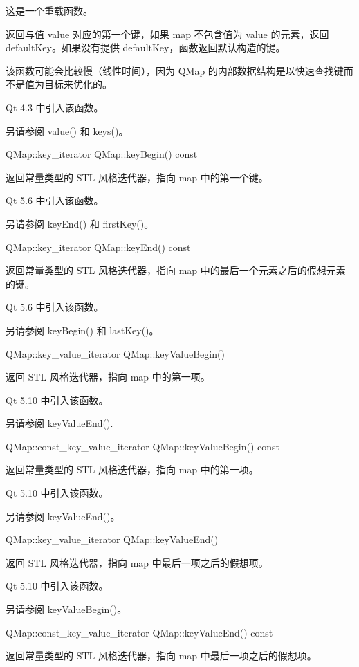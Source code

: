 这是一个重载函数。

返回与值 value 对应的第一个键，如果 map 不包含值为 value 的元素，返回 defaultKey。如果没有提供 defaultKey，函数返回默认构造的键。

该函数可能会比较慢（线性时间），因为 QMap 的内部数据结构是以快速查找键而不是值为目标来优化的。

Qt 4.3 中引入该函数。

另请参阅 value() 和 keys()。

\splitLine

QMap::key\_iterator QMap::keyBegin() const

返回常量类型的 STL 风格迭代器，指向 map 中的第一个键。

Qt 5.6 中引入该函数。

另请参阅 keyEnd() 和 firstKey()。

\splitLine

QMap::key\_iterator QMap::keyEnd() const

返回常量类型的 STL 风格迭代器，指向 map 中的最后一个元素之后的假想元素的键。

Qt 5.6 中引入该函数。

另请参阅 keyBegin() 和 lastKey()。

\splitLine

QMap::key\_value\_iterator QMap::keyValueBegin()

返回 STL 风格迭代器，指向 map 中的第一项。

Qt 5.10 中引入该函数。

另请参阅 keyValueEnd().

\splitLine

QMap::const\_key\_value\_iterator QMap::keyValueBegin() const

返回常量类型的 STL 风格迭代器，指向 map 中的第一项。

Qt 5.10 中引入该函数。

另请参阅 keyValueEnd()。

\splitLine

QMap::key\_value\_iterator QMap::keyValueEnd()

返回 STL 风格迭代器，指向 map 中最后一项之后的假想项。

Qt 5.10 中引入该函数。

另请参阅 keyValueBegin()。

\splitLine

QMap::const\_key\_value\_iterator QMap::keyValueEnd() const

返回常量类型的 STL 风格迭代器，指向 map 中最后一项之后的假想项。

